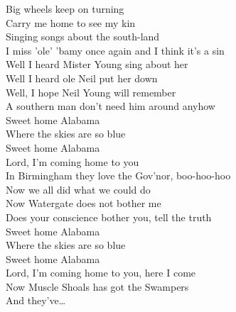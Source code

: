 Big wheels keep on turning\\
Carry me home to see my kin\\
Singing songs about the south-land\\
I miss 'ole' 'bamy once again and I think it's a sin\\
Well I heard Mister Young sing about her\\
Well I heard ole Neil put her down\\
Well, I hope Neil Young will remember\\
A southern man don't need him around anyhow\\
Sweet home Alabama\\
Where the skies are so blue\\
Sweet home Alabama\\
Lord, I'm coming home to you\\
In Birmingham they love the Gov'nor, boo-hoo-hoo\\
Now we all did what we could do\\
Now Watergate does not bother me\\
Does your conscience bother you, tell the truth\\
Sweet home Alabama\\
Where the skies are so blue\\
Sweet home Alabama\\
Lord, I'm coming home to you, here I come\\
Now Muscle Shoals has got the Swampers\\
And they've…\\







